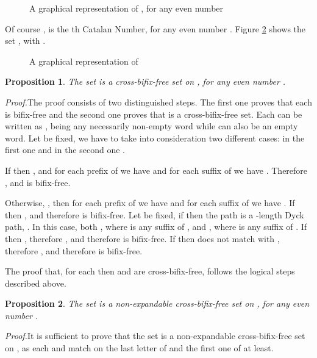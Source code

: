 \documentclass[a4paper,11pt]{article}
\newcommand{\cvd}{\hfill \bigskip}
\newtheorem{proposition}{Proposition}[section]
\begin{document}
\begin{figure}[!htb]
\begin{center}
 \caption{\small{A
graphical representation of , for any even number
} \label{paripari}}\vspace{-15pt}
\end{center}
\end{figure}

Of course ,  is
the th Catalan Number, for any even number . Figure
\ref{exmpari} shows the set , with
.

\begin{figure}[!htb]
\begin{center}
 \caption{\small{A
graphical representation of }
\label{exmpari}}\vspace{-15pt}
\end{center}
\end{figure}

\begin{proposition}\label{paripariCB}
The set  is a cross-bifix-free set on ,
for any even number .
\end{proposition}
\emph{Proof.}\quad The proof consists of two distinguished steps.
The first one proves that each  is
bifix-free and the second one proves that  is a
cross-bifix-free set. Each  can be
written as , being  any necessarily non-empty
word while  can also be an empty word. Let  be fixed, we
have to take into consideration two different cases: in the first
one  and in the second one .

If  then , and for each prefix  of  we have  and for each suffix  of  we have . Therefore ,  and
 is bifix-free.

Otherwise, , then for each prefix  of  we have  and for each suffix  of  we have . If  then ,  and therefore  is bifix-free. Let  be fixed, if
 then the path  is a -length Dyck path, . In this case, both , where
 is any suffix of , and ,
where  is any suffix of . If  then , therefore ,  and therefore  is bifix-free. If  then  does not match with , therefore ,  and
therefore  is bifix-free.

The proof that, for each  then
 and  are cross-bifix-free, follows the logical
steps described above. \cvd

\begin{proposition}\label{paripariNE}
The set  is a non-expandable cross-bifix-free set on
, for any even number .
\end{proposition}
\emph{Proof.}\quad It is sufficient to prove that the set
 is a non-expandable cross-bifix-free set on
, as each  and  match on the last letter of  and
the first one of  at least.
\end{document}
